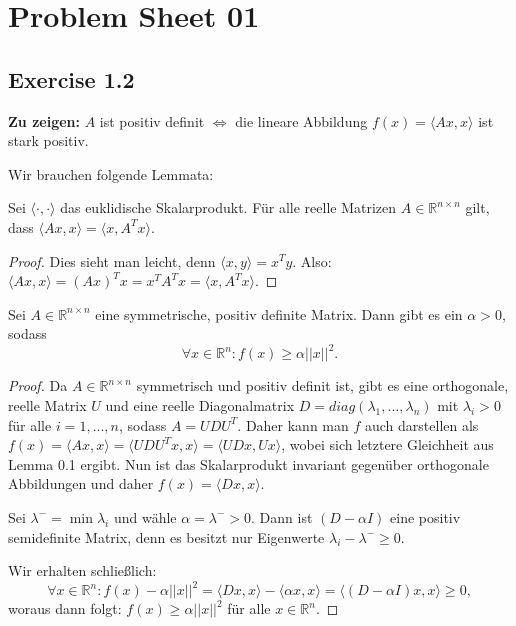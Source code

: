 \documentclass[a4paper, landscape,twocolumn,fontsize=9pt]{scrartcl}
\begin{document}
\section*{Problem Sheet 01}
\subsection*{Exercise 1.2}
\textbf{Zu zeigen:} $A$ ist positiv definit $\iff$ die lineare Abbildung $f(x) = \langle Ax,x \rangle$ ist stark positiv.

Wir brauchen folgende Lemmata:

\begin{lemma}{}{}
	Sei $\langle \cdot, \cdot \rangle$ das euklidische Skalarprodukt. Für alle reelle Matrizen $A \in \mathbb R^{n \times n}$ gilt, dass $\langle Ax,x \rangle = \langle x,A^Tx \rangle$.	
\end{lemma}
\begin{proof}
	Dies sieht man leicht, denn $\langle x,y \rangle = x^Ty$. Also: $\langle Ax,x \rangle = (Ax)^Tx = x^TA^Tx = \langle x,A^Tx \rangle$.
\end{proof}

\begin{lemma}{}{}
	Sei $A \in \mathbb R^{n \times n}$ eine symmetrische, positiv definite Matrix. Dann gibt es ein $\alpha > 0$, sodass 
	\begin{equation*}
		\forall x \in \mathbb R^{n}: f(x) \geq \alpha ||x||^2.
	\end{equation*}
\end{lemma}

\begin{proof}
	Da $A \in \mathbb R^{n \times n}$ symmetrisch und positiv definit ist, gibt es eine orthogonale, reelle Matrix $U$ und eine reelle Diagonalmatrix $D = diag(\lambda_1,...,\lambda_n)$ mit $\lambda_i > 0$ für alle $i = 1,...,n$, sodass $A = UDU^T$. Daher kann man $f$ auch darstellen als $f(x) = \langle Ax,x \rangle = \langle UDU^Tx,x \rangle = \langle UDx, Ux \rangle$, wobei sich letztere Gleichheit aus Lemma 0.1 ergibt. Nun ist das Skalarprodukt invariant gegenüber orthogonale Abbildungen und daher $f(x) = \langle Dx,x \rangle$.
	
	Sei $\lambda^- = \min \lambda_i$ und wähle $\alpha = \lambda^- > 0$. Dann ist $(D-\alpha I)$ eine positiv semidefinite Matrix, denn es besitzt nur Eigenwerte $\lambda_i - \lambda^- \geq 0$. 
	
	Wir erhalten schließlich: $$\forall x \in \mathbb R^n: f(x) - \alpha ||x||^2 = \langle Dx,x\rangle - \langle \alpha x,x \rangle = \langle (D-\alpha I)x,x \rangle \geq 0,$$
	woraus dann folgt: $f(x) \geq \alpha ||x||^2$ für alle $x \in \mathbb R^n$.
\end{proof}
\end{document}
